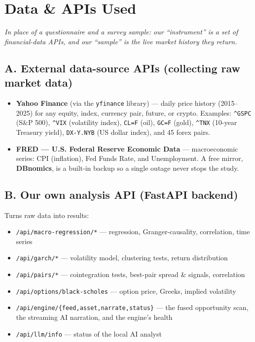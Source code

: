 \documentclass[11pt]{article}
\newcommand{\tk}[1]{\texttt{#1}}
\begin{document}
\section{Data \& APIs Used}
\textit{In place of a questionnaire and a survey sample: our ``instrument'' is a set
of financial-data APIs, and our ``sample'' is the live market history they return.}

\subsection{A. External data-source APIs (collecting raw market data)}
\begin{itemize}
\item \textbf{Yahoo Finance} (via the \tk{yfinance} library) — daily price history
(2015--2025) for any equity, index, currency pair, future, or crypto. Examples:
\tk{\textasciicircum{}GSPC} (S\&P 500), \tk{\textasciicircum{}VIX} (volatility index),
\tk{CL=F} (oil), \tk{GC=F} (gold), \tk{\textasciicircum{}TNX} (10-year Treasury
yield), \tk{DX-Y.NYB} (US dollar index), and 45 forex pairs.
\item \textbf{FRED — U.S. Federal Reserve Economic Data} — macroeconomic series:
CPI (inflation), Fed Funds Rate, and Unemployment. A free mirror, \textbf{DBnomics},
is a built-in backup so a single outage never stops the study.
\end{itemize}

\subsection{B. Our own analysis API (FastAPI backend)}
Turns raw data into results:
\begin{itemize}
\item \tk{/api/macro-regression/*} — regression, Granger-causality, correlation, time series
\item \tk{/api/garch/*} — volatility model, clustering tests, return distribution
\item \tk{/api/pairs/*} — cointegration tests, best-pair spread \& signals, correlation
\item \tk{/api/options/black-scholes} — option price, Greeks, implied volatility
\item \tk{/api/engine/\{feed,asset,narrate,status\}} — the fused opportunity scan, the
streaming AI narration, and the engine's health
\item \tk{/api/llm/info} — status of the local AI analyst
\end{itemize}
\end{document}
